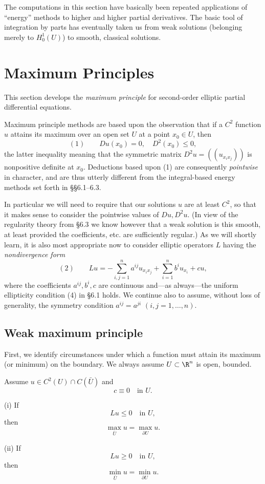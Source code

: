 The computations in this section have basically been repeated applications of ``energy'' methods to higher and higher partial derivatives. The basic tool of integration by parts has eventually taken us from weak solutions (belonging merely to $H_0^1(U)$) to smooth, classical solutions.

\section{Maximum Principles}
\label{sec:elliptic-maximum-principles}

This section develops the \textit{maximum principle} for second-order elliptic partial differential equations.

Maximum principle methods are based upon the observation that if a $C^2$ function $u$ attains its maximum over an open set $U$ at a point $x_0 \in U$, then
$$(1) \qquad Du(x_0) = 0, \quad D^2(x_0) \leq 0,$$
the latter inequality meaning that the symmetric matrix $D^2u = ((u_{x_ix_j}))$ is nonpositive definite at $x_0$. Deductions based upon (1) are consequently \textit{pointwise} in character, and are thus utterly different from the integral-based energy methods set forth in \S\S6.1--6.3.

In particular we will need to require that our solutions $u$ are at least $C^2$, so that it makes sense to consider the pointwise values of $Du, D^2u$. (In view of the regularity theory from \S6.3 we know however that a weak solution is this smooth, at least provided the coefficients, etc. are sufficiently regular.) As we will shortly learn, it is also most appropriate now to consider elliptic operators $L$ having the \textit{nondivergence form}
$$(2) \qquad Lu = -\sum_{i,j=1}^n a^{ij}u_{x_ix_j} + \sum_{i=1}^n b^iu_{x_i} + cu,$$
where the coefficients $a^{ij}, b^i, c$ are continuous and---as always---the uniform ellipticity condition (4) in \S6.1 holds. We continue also to assume, without loss of generality, the symmetry condition $a^{ij} = a^{ji}$ $(i,j=1,\ldots,n)$.

\subsection{Weak maximum principle}

First, we identify circumstances under which a function must attain its maximum (or minimum) on the boundary. We always assume $U \subset \R^n$ is open, bounded.

\begin{theorem}
\label{thm:weak-maximum-principle-c-zero}
Assume $u \in C^2(U) \cap C(\bar U)$ and
$$c \equiv 0 \quad \text{in } U.$$

(i) If
$$Lu \leq 0 \quad \text{in } U,$$
then
$$\max_{\bar U} u = \max_{\partial U} u.$$

(ii) If
$$Lu \geq 0 \quad \text{in } U,$$
then
$$\min_{\bar U} u = \min_{\partial U} u.$$
\end{theorem}

